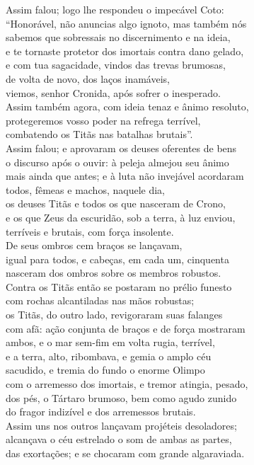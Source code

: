 \begin{pages}
\begin{Rightside}
\quad{}Assim falou; logo lhe respondeu o impecável Coto:\\
``Honorável, não anuncias algo ignoto, mas também nós \\
sabemos que sobressais no discernimento e na ideia,\\
e te tornaste protetor dos imortais contra dano gelado,\\
e com tua sagacidade, vindos das trevas brumosas,\\
de volta de novo, dos laços inamáveis,\\
viemos, senhor Cronida, após sofrer o inesperado. \\
Assim também agora, com ideia tenaz e ânimo resoluto,\\
protegeremos vosso poder na refrega terrível,\\
combatendo os Titãs nas batalhas brutais''.\\
Assim falou; e aprovaram os deuses oferentes de bens\\
o discurso após o ouvir: à peleja almejou seu ânimo \\
mais ainda que antes; e à luta não invejável acordaram\\
todos, fêmeas e machos, naquele dia,\\
os deuses Titãs e todos os que nasceram de Crono,\\
e os que Zeus da escuridão, sob a terra, à luz enviou,\\
terríveis e brutais, com força insolente. \\
De seus ombros cem braços se lançavam,\\
igual para todos, e cabeças, em cada um, cinquenta\\
nasceram dos ombros sobre os membros robustos.\\
Contra os Titãs então se postaram no prélio funesto\\
com rochas alcantiladas nas mãos robustas; \\
os Titãs, do outro lado, revigoraram suas falanges\\
com afã: ação conjunta de braços e de força mostraram\\
ambos, e o mar sem-fim em volta rugia, terrível,\\
e a terra, alto, ribombava, e gemia o amplo céu\\
sacudido, e tremia do fundo o enorme Olimpo \\
com o arremesso dos imortais, e tremor atingia, pesado,\\
dos pés, o Tártaro brumoso, bem como agudo zunido\\
do fragor indizível e dos arremessos brutais.\\
Assim uns nos outros lançavam projéteis desoladores;\\
alcançava o céu estrelado o som de ambas as partes, \\
das exortações; e se chocaram com grande algaraviada.\\


\end{Rightside}
\end{pages}
